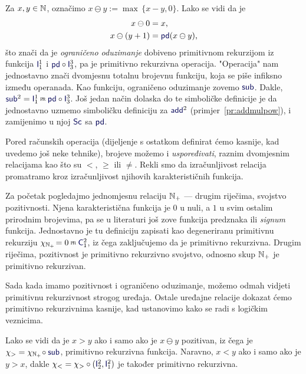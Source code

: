 \begin{primjer}\label{pr:sub}
Za $x,y\in{\mathbb N}$, označimo $x\ominus y:=\max\,\{x-y,0\}$. Lako se vidi da je
\begin{align}
    x\ominus0&=x\text,\\
    x\ominus(y+1)&=\f{pd}(x\ominus y)\text,
\end{align}
što znači da je \emph{ograničeno oduzimanje} dobiveno primitivnom rekurzijom iz funkcija $\f I_1^1$ i $\f{pd}\circ\f I_3^3$, pa je primitivno rekurzivna operacija. "Operacija" nam jednostavno znači dvomjesnu totalnu brojevnu funkciju, koja se piše infiksno između operanada. Kao funkciju, ograničeno oduzimanje zovemo $\f{sub}$. Dakle, $\f{sub}^2=\f I_1^1\pr\f{pd}\circ\f I_3^3$. Još jedan način dolaska do te simboličke definicije je da jednostavno uzmemo simboličku definiciju za $\f{add}^2$ (primjer~\ref{pr:addmulpow}), i zamijenimo u njoj $\f{Sc}$ sa $\f{pd}$.
\end{primjer}

Pored računskih operacija (dijeljenje s ostatkom definirat ćemo kasnije, kad uvedemo još neke tehnike), brojeve možemo i \emph{uspoređivati}, raznim dvomjesnim relacijama  kao što su $<$, $\ge$ ili $\not=$. Rekli smo da izračunljivost relacija promatramo kroz izračunljivost njihovih karakterističnih funkcija.

\begin{primjer}\label{pr:N+prn}
Za početak pogledajmo jednomjesnu relaciju ${\mathbb N}_+$ --- drugim riječima, svojstvo pozitivnosti. Njena karakteristična funkcija je $0$ u nuli, a $1$ u svim ostalim prirodnim brojevima, pa se u literaturi još zove funkcija predznaka ili \emph{signum} funkcija. Jednostavno je tu definiciju zapisati kao degeneriranu primitivnu rekurziju $\chi_{\N_+}\!=0\pr\f C_1^2$, iz čega zaključujemo da je primitivno rekurzivna. Drugim riječima, pozitivnost je primitivno rekurzivno svojstvo, odnosno skup ${\mathbb N}_+$ je primitivno rekurzivan.
\end{primjer}

Sada kada imamo pozitivnost i ograničeno oduzimanje, možemo odmah vidjeti primitivnu rekurzivnost strogog uređaja. Ostale uređajne relacije dokazat ćemo primitivno rekurzivnima kasnije, kad ustanovimo kako se radi s logičkim veznicima.

\begin{primjer}\label{pr:m-v}
Lako se vidi da je $x>y$ ako i samo ako je $x\ominus y$ pozitivan, iz čega je $\chi_>=\chi_{\N_+}\!\circ\f{sub}$, pri\-mi\-tiv\-no rekurzivna funkcija. Naravno, $x<y$ ako i samo ako je $y>x$, dakle $\chi_<=\chi_>\circ(\f I_2^2,\f I_1^2)$ je također primitivno rekurzivna.
\end{primjer}

